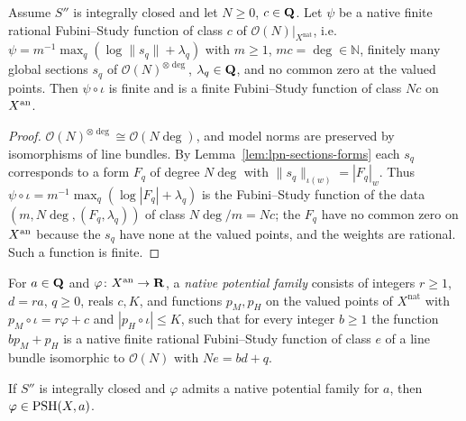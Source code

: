 \begin{theorem}\label{thm:lpn-native-fs-bridge}
\leanok
{}
Assume $S''$ is integrally closed and let $N\ge0$, $c\in\mathbf{Q}$. Let $\psi$ be a native finite rational
Fubini--Study function of class $c$ of $\mathcal O(N)|_{X^{\mathrm{nat}}}$, i.e.\ $\psi=m^{-1}\max_q(\log\|s_q\|+\lambda_q)$
with $m\ge1$, $mc=\deg\in\mathbb N$, finitely many global sections $s_q$ of $\mathcal O(N)^{\otimes\deg}$,
$\lambda_q\in\mathbf{Q}$, and no common zero at the valued points. Then $\psi\circ\iota$ is finite and is a finite
Fubini--Study function of class $Nc$ on $X^{\mathrm{an}}$.
\end{theorem}

\begin{proof}
$\mathcal O(N)^{\otimes\deg}\cong\mathcal O(N\deg)$, and model norms are preserved by isomorphisms of line bundles.
By Lemma~\ref{lem:lpn-sections-forms} each $s_q$ corresponds to a form $F_q$ of degree $N\deg$ with
$\|s_q\|_{\iota(w)}=|F_q|_w$. Thus $\psi\circ\iota=m^{-1}\max_q(\log|F_q|+\lambda_q)$ is the Fubini--Study function of
the data $(m,N\deg,(F_q,\lambda_q))$ of class $N\deg/m=Nc$; the $F_q$ have no common zero on $X^{\mathrm{an}}$ because the
$s_q$ have none at the valued points, and the weights are rational. Such a function is finite.
\end{proof}

\begin{definition}\label{def:lpn-native-potential-family}
\leanok
{}
For $a\in\mathbf{Q}$ and $\varphi\colon X^{\mathrm{an}}\to\mathbf{R}$, a \emph{native potential family} consists of integers $r\ge1$,
$d=ra$, $q\ge0$, reals $c,K$, and functions $p_M,p_H$ on the valued points of $X^{\mathrm{nat}}$ with
$p_M\circ\iota=r\varphi+c$ and $|p_H\circ\iota|\le K$, such that for every integer $b\ge1$ the function $bp_M+p_H$ is
a native finite rational Fubini--Study function of class $e$ of a line bundle isomorphic to $\mathcal O(N)$ with
$Ne=bd+q$.
\end{definition}

\begin{theorem}\label{thm:lpn-native-potential-psh}
\leanok
{}
If $S''$ is integrally closed and $\varphi$ admits a native potential family for $a$, then $\varphi\in\operatorname{PSH}(X,a)$.
\end{theorem}

